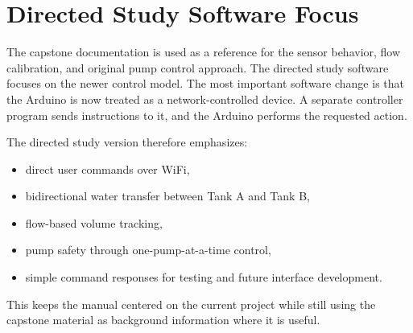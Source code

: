 \section{Directed Study Software Focus}

The capstone documentation is used as a reference for the sensor behavior, flow calibration, and original pump control approach. The directed study software focuses on the newer control model. The most important software change is that the Arduino is now treated as a network-controlled device. A separate controller program sends instructions to it, and the Arduino performs the requested action.

The directed study version therefore emphasizes:

\begin{itemize}
    \item direct user commands over WiFi,
    \item bidirectional water transfer between Tank A and Tank B,
    \item flow-based volume tracking,
    \item pump safety through one-pump-at-a-time control,
    \item simple command responses for testing and future interface development.
\end{itemize}

This keeps the manual centered on the current project while still using the capstone material as background information where it is useful.
